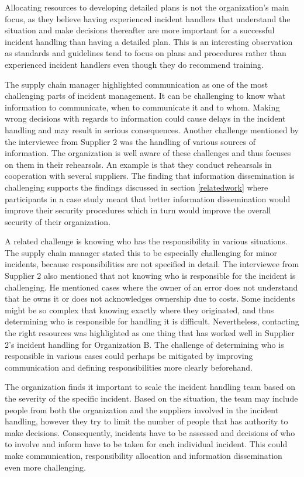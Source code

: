 Allocating resources to developing detailed plans is not the organization's main focus, as they believe having experienced incident handlers that understand the situation and make decisions thereafter are more important for a successful incident handling than having a detailed plan. This is an interesting observation as standards and guidelines tend to focus on plans and procedures rather than experienced incident handlers even though they do recommend training. 

The supply chain manager highlighted communication as one of the most challenging parts of incident management. It can be challenging to know what information to communicate, when to communicate it and to whom. Making wrong decisions with regards to information could cause delays in the incident handling and may result in serious consequences. Another challenge mentioned by the interviewee from Supplier 2 was the handling of various sources of information. The organization is well aware of these challenges and thus focuses on them in their rehearsals. An example is that they conduct rehearsals in cooperation with several suppliers. The finding that information dissemination is challenging supports the findings discussed in section \ref{relatedwork} where participants in a case study meant that better information dissemination would improve their security procedures which in turn would improve the overall security of their organization. 

A related challenge is knowing who has the responsibility in various situations. The supply chain manager stated this to be especially challenging for minor incidents, because responsibilities are not specified in detail. The interviewee from Supplier 2 also mentioned that not knowing who is responsible for the incident is challenging. He mentioned cases where the owner of an error does not understand that he owns it or does not acknowledges ownership due to costs. Some incidents might be so complex that knowing exactly where they originated, and thus determining who is responsible for handling it is difficult. Nevertheless, contacting the right resources was highlighted as one thing that has worked well in Supplier 2's incident handling for Organization B. The challenge of determining who is responsible in various cases could perhaps be mitigated by improving communication and defining responsibilities more clearly beforehand.

The organization finds it important to scale the incident handling team based on the severity of the specific incident. Based on the situation, the team may include people from both the organization and the suppliers involved in the incident handling, however they try to limit the number of people that has authority to make decisions. Consequently, incidents have to be assessed and decisions of who to involve and inform have to be taken for each individual incident. This could make communication, responsibility allocation and information dissemination even more challenging. 

